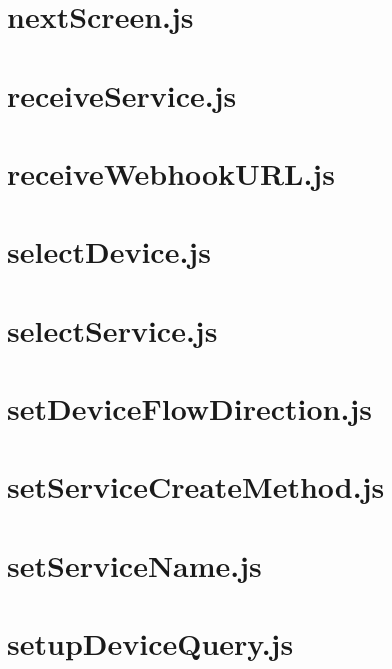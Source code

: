 \documentclass[a4paper,landscape]{report}
\begin{document}
\newpage
\section{nextScreen.js}


\newpage
\section{receiveService.js}


\newpage
\section{receiveWebhookURL.js}


\newpage
\section{selectDevice.js}


\newpage
\section{selectService.js}


\newpage
\section{setDeviceFlowDirection.js}


\newpage
\section{setServiceCreateMethod.js}


\newpage
\section{setServiceName.js}


\newpage
\section{setupDeviceQuery.js}

\end{document}
